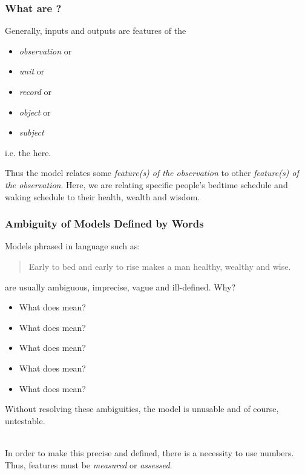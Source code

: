 \documentclass[slides]{beamer} %
\begin{document}
\begin{frame}\frametitle{What are ?}

Generally, inputs and outputs are features of the 

\begin{itemize}
\item \textit{observation} or 
\item \textit{unit} or 
\item \textit{record} or 
\item \textit{object} or 
\item \textit{subject}
\end{itemize} 

i.e. the  here.


Thus the model relates some \textit{feature(s) of the observation}  \pause to other \textit{feature(s) of the observation}.  \pause Here, we are relating specific people's bedtime schedule and waking schedule to their health, wealth and wisdom.
\end{frame}






\begin{frame}\frametitle{Ambiguity of Models Defined by Words}

\small
Models phrased in language such as:

\begin{quotation}
Early to bed and early to rise makes a man healthy, wealthy and wise.
\end{quotation}

are usually ambiguous, imprecise, vague and ill-defined. Why? \pause 

\begin{itemize}
\item What does  mean? 
\item What does  mean? 
\item What does  mean? 
\item What does  mean? 
\item What does  mean? \pause 
\end{itemize}

Without resolving these ambiguities, the model is unusable and of course, untestable. \\~\\ \pause


In order to make this precise and defined, there is a necessity to use numbers. \pause Thus, features must be \textit{measured} or \textit{assessed}. 
	
\end{frame}
\end{document}
